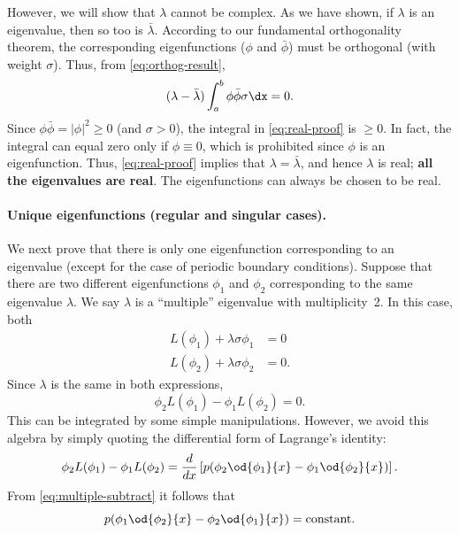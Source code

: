 However, we will show that $\lambda$ cannot be complex.  As we have shown, if $\lambda$ is an eigenvalue, then so too is $\bar{\lambda}$.  According to our fundamental orthogonality theorem, the corresponding eigenfunctions ($\phi$ and $\bar{\phi}$) must be orthogonal (with weight $\sigma$).  Thus, from \eqref{eq:orthog-result},
\begin{equation}
\label{eq:real-proof}
(\lambda - \bar{\lambda})\int_a^b \phi\bar{\phi}\sigma\dx = 0.
\end{equation}
Since $\phi\bar{\phi} = |\phi|^2 \ge 0$ (and $\sigma > 0$), the integral in \eqref{eq:real-proof} is $\ge 0$.  In fact, the integral can equal zero only if $\phi \equiv 0$, which is prohibited since $\phi$ is an eigenfunction.  Thus, \eqref{eq:real-proof} implies that $\lambda = \bar{\lambda}$, and hence $\lambda$ is real; \textbf{all the eigenvalues are real}.  The eigenfunctions can always be chosen to be real.

\paragraph{Unique eigenfunctions (regular and singular cases).}
We next prove that there is only one eigenfunction corresponding to an eigenvalue (except for the case of periodic boundary conditions).  Suppose that there are two different eigenfunctions $\phi_1$ and $\phi_2$ corresponding to the same eigenvalue $\lambda$.  We say $\lambda$ is a ``multiple'' eigenvalue with multiplicity~2.  In this case, both
\begin{equation}
\label{eq:multiple-eigen}
\begin{aligned}
L(\phi_1) + \lambda\sigma\phi_1 &= 0 \\
L(\phi_2) + \lambda\sigma\phi_2 &= 0.
\end{aligned}
\end{equation}
Since $\lambda$ is the same in both expressions,
\begin{equation}
\label{eq:multiple-subtract}
\phi_2 L(\phi_1) - \phi_1 L(\phi_2) = 0.
\end{equation}
This can be integrated by some simple manipulations.  However, we avoid this algebra by simply quoting the differential form of Lagrange's identity:
\begin{equation}
\label{eq:lagrange-diff}
\phi_2 L(\phi_1) - \phi_1 L(\phi_2) = \frac{d}{d x}\left[p\!\left(\phi_2\od{\phi_1}{x} - \phi_1\od{\phi_2}{x}\right)\right].
\end{equation}
From \eqref{eq:multiple-subtract} it follows that
\begin{equation}
\label{eq:wronskian-const}
p\!\left(\phi_1\od{\phi_2}{x} - \phi_2\od{\phi_1}{x}\right) = \text{constant}.
\end{equation}

